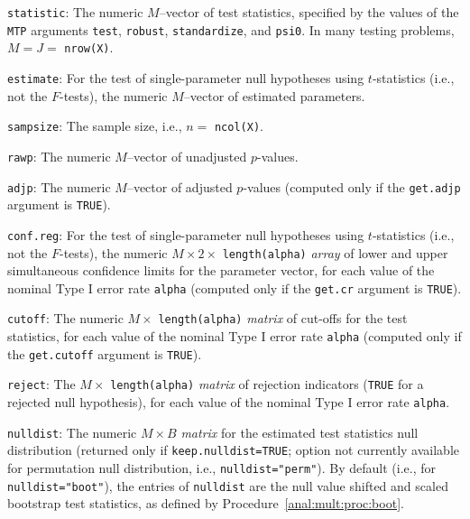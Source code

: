 \documentclass[11pt]{article}
\newcommand{\Robject}[1]{\texttt{#1}}
\newcommand{\Rclass}[1]{\textit{#1}}
\begin{document}
\begin{description}

\item{\Robject{statistic}:} The numeric $M$--vector of test statistics, specified by the values of the \Robject{MTP} arguments \Robject{test}, \Robject{robust}, \Robject{standardize}, and \Robject{psi0}. In many testing problems, $M = J = $ \Robject{nrow(X)}.

\item{\Robject{estimate}:} For the test of single-parameter null hypotheses using $t$-statistics (i.e., not the $F$-tests), the numeric $M$--vector of estimated parameters.

\item{\Robject{sampsize}:} The sample size, i.e., $n=$ \Robject{ncol(X)}.

\item{\Robject{rawp}:} The numeric $M$--vector of unadjusted $p$-values.

\item{\Robject{adjp}:} The numeric $M$--vector of adjusted $p$-values (computed only if the \Robject{get.adjp} argument is \Robject{TRUE}).

\item{\Robject{conf.reg}:}  For the test of single-parameter null hypotheses using $t$-statistics (i.e., not the $F$-tests), the numeric $M \times 2 \times$ \Robject{length(alpha)} \Rclass{array} of lower and upper simultaneous confidence limits for the parameter vector, for each value of the nominal Type I error rate \Robject{alpha} (computed only if the \Robject{get.cr} argument is \Robject{TRUE}). 

\item{\Robject{cutoff}:} The numeric $M \times$ \Robject{length(alpha)} \Rclass{matrix} of cut-offs for the test statistics, for each value of the nominal Type I error rate \Robject{alpha} (computed only if the \Robject{get.cutoff} argument is \Robject{TRUE}).

\item{\Robject{reject}:} 
The $M \times$ \Robject{length(alpha)} \Rclass{matrix} of rejection indicators (\Robject{TRUE} for a rejected null hypothesis), for each value of the nominal Type I error rate \Robject{alpha}.

\item{\Robject{nulldist}:} The numeric $M \times B$ \Rclass{matrix} for the estimated test statistics null distribution (returned only if \texttt{keep.nulldist=TRUE}; option not currently available for permutation null distribution, i.e.,  \texttt{nulldist="perm"}).
By default (i.e., for \Robject{nulldist="boot"}), the entries of \Robject{nulldist} are the null value shifted and scaled bootstrap test statistics, as defined by Procedure~\ref{anal:mult:proc:boot}.


\end{description}
\end{document}
